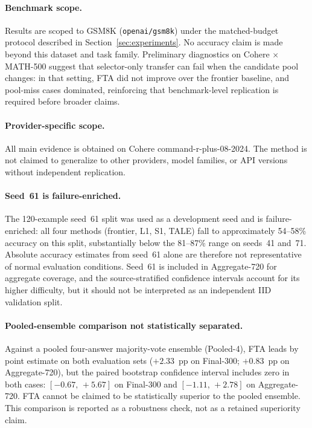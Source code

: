 \documentclass[smallcondensed]{svjour3}
\begin{document}
\paragraph{Benchmark scope.}
Results are scoped to GSM8K (\texttt{openai/gsm8k}) under the matched-budget
protocol described in Section~\ref{sec:experiments}.
No accuracy claim is made beyond this dataset and task family.
Preliminary diagnostics on Cohere $\times$ MATH-500 suggest that selector-only transfer can fail when the candidate pool changes: in that setting, FTA did not improve over the frontier baseline, and pool-miss cases dominated, reinforcing that benchmark-level replication is required before broader claims.

\paragraph{Provider-specific scope.}
All main evidence is obtained on Cohere command-r-plus-08-2024.
The method is not claimed to generalize to other providers, model families,
or API versions without independent replication.

\paragraph{Seed~61 is failure-enriched.}
The 120-example seed~61 split was used as a development seed and is
failure-enriched: all four methods (frontier, L1, S1, TALE) fall to
approximately 54--58\% accuracy on this split, substantially below the
81--87\% range on seeds~41 and~71.
Absolute accuracy estimates from seed~61 alone are therefore not
representative of normal evaluation conditions.
Seed~61 is included in Aggregate-720 for aggregate coverage, and the
source-stratified confidence intervals account for its higher difficulty,
but it should not be interpreted as an independent IID validation split.

\paragraph{Pooled-ensemble comparison not statistically separated.}
Against a pooled four-answer majority-vote ensemble (Pooled-4), FTA leads by
point estimate on both evaluation sets ($+2.33$~pp on Final-300;
$+0.83$~pp on Aggregate-720), but the paired bootstrap confidence interval
includes zero in both cases: $[-0.67,\,+5.67]$ on Final-300 and
$[-1.11,\,+2.78]$ on Aggregate-720.
FTA cannot be claimed to be statistically superior to the pooled ensemble.
This comparison is reported as a robustness check, not as a retained
superiority claim.
\end{document}
